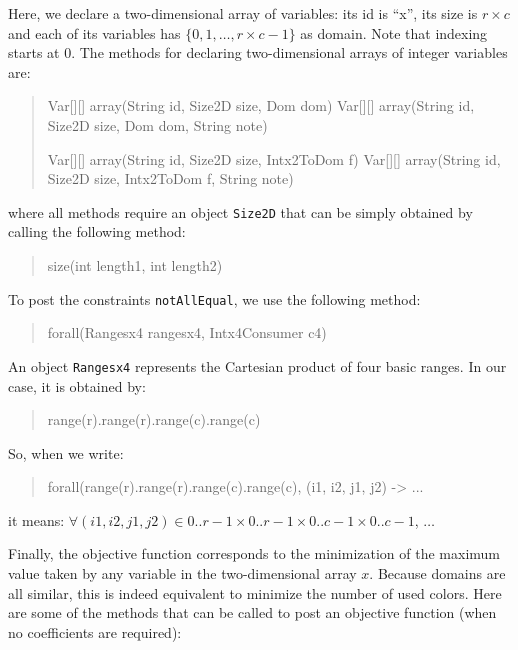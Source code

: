\documentclass[10pt]{article}
\newcommand{\gb}[1]{{\tt #1}} %
\newcommand{\nn}[1]{{\tt #1}} %
\newenvironment{myvb}{\endgraf\small\verbatim}{\endverbatim}
\begin{document}
Here, we declare a two-dimensional array of variables: its id is ``x'', its size is $r \times c$ and each of its variables has $\{0,1,\dots,r\times c-1\}$ as domain.
Note that indexing starts at 0.
The methods for declaring two-dimensional arrays of integer variables are:

\begin{quote}
\begin{myvb}
Var[][] array(String id, Size2D size, Dom dom)
Var[][] array(String id, Size2D size, Dom dom, String note)

Var[][] array(String id, Size2D size, Intx2ToDom f)
Var[][] array(String id, Size2D size, Intx2ToDom f, String note) 
\end{myvb}
\end{quote}

where all methods require an object \nn{Size2D} that can be simply obtained by calling the following method:
\begin{quote}
\begin{myvb}
size(int length1, int length2)
\end{myvb}
\end{quote}

To post the constraints \gb{notAllEqual}, we use the following method:

\begin{quote}
\begin{myvb}
forall(Rangesx4 rangesx4, Intx4Consumer c4) 
\end{myvb}
\end{quote}

An object \nn{Rangesx4} represents the Cartesian product of four basic ranges. In our case, it is obtained by:
\begin{quote}
\begin{myvb}
range(r).range(r).range(c).range(c)
\end{myvb}
\end{quote}
So, when we write:
\begin{quote}
\begin{myvb}
forall(range(r).range(r).range(c).range(c), (i1, i2, j1, j2) -> ...
\end{myvb}
\end{quote}
it means: $\forall (i1,i2,j1,j2) \in 0..r-1 \times 0..r-1 \times 0..c-1 \times 0..c-1$, $\dots$

\bigskip
Finally, the objective function corresponds to the minimization of the maximum value taken by any variable in the two-dimensional array $x$.
Because domains are all similar, this is indeed equivalent to minimize the number of used colors.
Here are some of the methods that can be called to post an objective function (when no coefficients are required):
\end{document}
